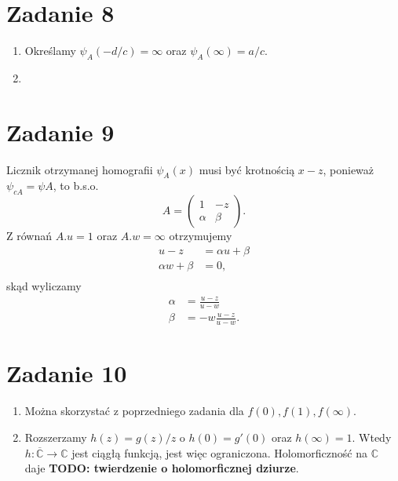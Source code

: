 \section*{Zadanie 8}

\begin{enumerate}
    \item
    Określamy \( \psi_A(-d/c) = \infty \) oraz \( \psi_A(\infty) = a/c \). 

    \item
\end{enumerate}

\section*{Zadanie 9}

Licznik otrzymanej homografii \( \psi_A(x) \) musi być krotnością \( x - z \), ponieważ \( \psi_{cA} = \psi{A} \), to b.s.o.
\[ 
    A =  
    \begin{pmatrix}
        1 & -z \\
        \alpha & \beta
    \end{pmatrix}.
\]
Z równań \( A.u = 1 \) oraz \( A.w = \infty \) otrzymujemy
\begin{align}
    u - z &= \alpha u + \beta \\
    \alpha w + \beta &= 0, \\
\end{align}
skąd wyliczamy
\begin{align}
    \alpha &= \frac{u-z}{u - w} \\ 
    \beta &= -w\frac{u-z}{u-w}.
\end{align}

\section*{Zadanie 10}

\begin{enumerate}
    \item Można skorzystać z poprzedniego zadania dla \( f(0), f(1), f(\infty) \).

    \item Rozszerzamy \( h(z) = g(z)/z \) o \( h(0) = g'(0) \) oraz \( h(\infty) = 1 \). Wtedy \( h: \overline{\mathbb{C}} \to \mathbb{C} \) jest ciągłą funkcją, jest więc ograniczona. Holomorficzność na \( \mathbb{C} \) daje \textbf{TODO: twierdzenie o holomorficznej dziurze}.
\end{enumerate}

